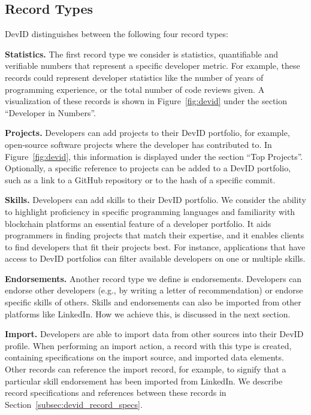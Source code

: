 \subsection{Record Types}
\label{subsec:record_types}
DevID distinguishes between the following four record types:

\textbf{Statistics.}
The first record type we consider is statistics, quantifiable and verifiable numbers that represent a specific developer metric.
For example, these records could represent developer statistics like the number of years of programming experience, or the total number of code reviews given.
A visualization of these records is shown in Figure~\ref{fig:devid} under the section \enquote{Developer in Numbers}.

\textbf{Projects.}
Developers can add projects to their DevID portfolio, for example, open-source software projects where the developer has contributed to.
In Figure~\ref{fig:devid}, this information is displayed under the section \enquote{Top Projects}.
Optionally, a specific reference to projects can be added to a DevID portfolio, such as a link to a GitHub repository or to the hash of a specific commit.

\textbf{Skills.}
Developers can add skills to their DevID portfolio.
We consider the ability to highlight proficiency in specific programming languages and familiarity with blockchain platforms an essential feature of a developer portfolio.
It aids programmers in finding projects that match their expertise, and it enables clients to find developers that fit their projects best.
For instance, applications that have access to DevID portfolios can filter available developers on one or multiple skills.

\textbf{Endorsements.}
Another record type we define is endorsements.
Developers can endorse other developers (e.g., by writing a letter of recommendation) or endorse specific skills of others.
Skills and endorsements can also be imported from other platforms like LinkedIn.
How we achieve this, is discussed in the next section.

\textbf{Import.}
Developers are able to import data from other sources into their DevID profile.
When performing an import action, a record with this type is created, containing specifications on the import source, and imported data elements.
Other records can reference the import record, for example, to signify that a particular skill endorsement has been imported from LinkedIn.
We describe record specifications and references between these records in Section~\ref{subsec:devid_record_specs}.

